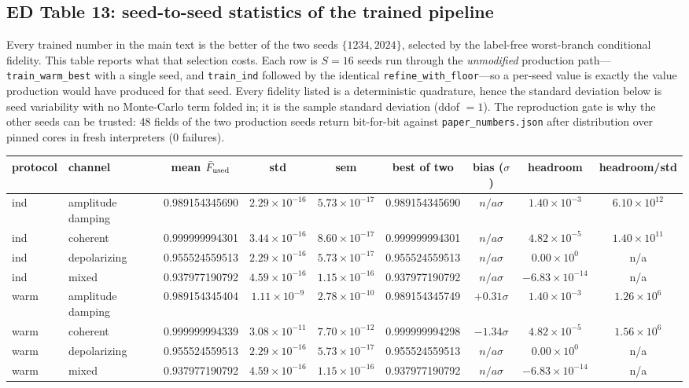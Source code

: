 \documentclass[10pt,a4paper]{article}
\begin{document}
\subsection*{ED Table 13: seed-to-seed statistics of the trained pipeline}
Every trained number in the main text is the better of the two seeds
$\{1234,2024\}$, selected by the label-free worst-branch conditional fidelity.
This table reports what that selection costs.  Each row is $S=16$ seeds run
through the \emph{unmodified} production path---\texttt{train\_warm\_best} with a
single seed, and \texttt{train\_ind} followed by the identical
\texttt{refine\_with\_floor}---so a per-seed value is exactly the value
production would have produced for that seed.  Every fidelity listed is a
deterministic quadrature, hence the standard deviation below is seed variability
with no Monte-Carlo term folded in; it is the sample standard deviation
(ddof $=1$).  The reproduction gate is why the other seeds can be trusted: 48
fields of the two production seeds return bit-for-bit against
\texttt{paper\_numbers.json} after distribution over pinned cores in fresh
interpreters (0 failures).
\begin{longtable}{llccccccc}
\toprule protocol & channel & mean $\bar F_{\rm used}$ & std & sem & best of two & bias ($\sigma$) & headroom & headroom/std \\ \midrule
ind & amplitude damping & 0.989154345690 & $2.29\times 10^{-16}$ & $5.73\times 10^{-17}$ & 0.989154345690 & $n/a\sigma$ & $1.40\times 10^{-3}$ & $6.10\times 10^{12}$ \\
ind & coherent & 0.999999994301 & $3.44\times 10^{-16}$ & $8.60\times 10^{-17}$ & 0.999999994301 & $n/a\sigma$ & $4.82\times 10^{-5}$ & $1.40\times 10^{11}$ \\
ind & depolarizing & 0.955524559513 & $2.29\times 10^{-16}$ & $5.73\times 10^{-17}$ & 0.955524559513 & $n/a\sigma$ & $0.00\times 10^{0}$ & n/a \\
ind & mixed & 0.937977190792 & $4.59\times 10^{-16}$ & $1.15\times 10^{-16}$ & 0.937977190792 & $n/a\sigma$ & $-6.83\times 10^{-14}$ & n/a \\
warm & amplitude damping & 0.989154345404 & $1.11\times 10^{-9}$ & $2.78\times 10^{-10}$ & 0.989154345749 & $+0.31\sigma$ & $1.40\times 10^{-3}$ & $1.26\times 10^{6}$ \\
warm & coherent & 0.999999994339 & $3.08\times 10^{-11}$ & $7.70\times 10^{-12}$ & 0.999999994298 & $-1.34\sigma$ & $4.82\times 10^{-5}$ & $1.56\times 10^{6}$ \\
warm & depolarizing & 0.955524559513 & $2.29\times 10^{-16}$ & $5.73\times 10^{-17}$ & 0.955524559513 & $n/a\sigma$ & $0.00\times 10^{0}$ & n/a \\
warm & mixed & 0.937977190792 & $4.59\times 10^{-16}$ & $1.15\times 10^{-16}$ & 0.937977190792 & $n/a\sigma$ & $-6.83\times 10^{-14}$ & n/a \\
\bottomrule\end{longtable}
\end{document}

